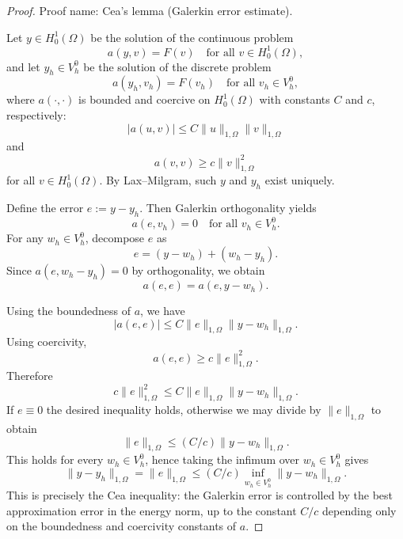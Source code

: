 \documentclass[12pt]{article}
\begin{document}
\begin{proof}
Proof name: Cea's lemma (Galerkin error estimate).

Let $y \in H^1_0(\Omega)$ be the solution of the continuous problem
\[
a(y,v)=F(v) \quad \text{for all } v\in H^1_0(\Omega),
\]
and let $y_h \in V^0_h$ be the solution of the discrete problem
\[
a(y_h,v_h)=F(v_h) \quad \text{for all } v_h\in V^0_h,
\]
where $a(\cdot,\cdot)$ is bounded and coercive on $H^1_0(\Omega)$ with constants $C$ and $c$, respectively:
\[
|a(u,v)| \le C \|u\|_{1,\Omega} \|v\|_{1,\Omega}
\]
and
\[
a(v,v) \ge c \|v\|_{1,\Omega}^2
\]
for all $v\in H^1_0(\Omega)$. By Lax--Milgram, such $y$ and $y_h$ exist uniquely.

Define the error $e := y - y_h$. Then Galerkin orthogonality yields
\[
a(e, v_h)=0 \quad \text{for all } v_h\in V^0_h.
\]
For any $w_h\in V^0_h$, decompose $e$ as
\[
e = (y - w_h) + (w_h - y_h).
\]
Since $a(e, w_h - y_h)=0$ by orthogonality, we obtain
\[
a(e,e)=a(e, y - w_h).
\]

Using the boundedness of $a$, we have
\[
|a(e,e)| \le C \|e\|_{1,\Omega} \|y - w_h\|_{1,\Omega}.
\]
Using coercivity,
\[
a(e,e) \ge c \|e\|_{1,\Omega}^2.
\]
Therefore
\[
c \|e\|_{1,\Omega}^2 \le C \|e\|_{1,\Omega} \|y - w_h\|_{1,\Omega}.
\]
If $e \equiv 0$ the desired inequality holds, otherwise we may divide by $\|e\|_{1,\Omega}$ to obtain
\[
\|e\|_{1,\Omega} \le (C/c) \|y - w_h\|_{1,\Omega}.
\]
This holds for every $w_h \in V^0_h$, hence taking the infimum over $w_h \in V^0_h$ gives
\[
\|y - y_h\|_{1,\Omega} = \|e\|_{1,\Omega} \le (C/c) \inf_{w_h\in V^0_h} \|y - w_h\|_{1,\Omega}.
\]
This is precisely the Cea inequality: the Galerkin error is controlled by the best approximation error in the energy norm, up to the constant $C/c$ depending only on the boundedness and coercivity constants of $a$.
\end{proof}
\end{document}

